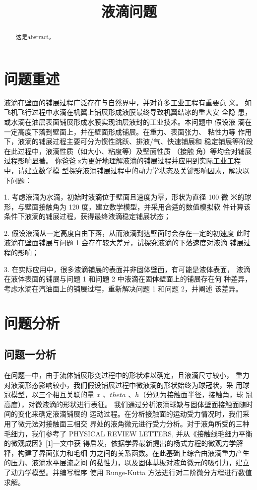 \documentclass{cumcmthesis}
\title{液滴问题}\tihao{A}
\begin{document}
\maketitle

\begin{abstract}
    这是abstract。

\end{abstract}

\section{问题重述}
液滴在壁面的铺展过程广泛存在与自然界中，并对许多工业工程有重要意
义。 如飞机飞行过程中水滴在机翼上铺展形成液膜最终导致机翼结冰的重大安
全隐 患，或水滴在油层表面铺展形成水膜实现油层液封的工业技术。本问题中
假设液 滴在一定高度下落到壁面上，并在壁面形成铺展。在重力、表面张力、
粘性力等 作用下，液滴的铺展过程主要可分为惯性跳跃、排液/气、快速铺展和
稳定铺展等阶段在此过程中，液滴性质（如大小、粘度等）及壁面性质 （接触
角）等均会对铺展过程影响显著。     你爸爸
z为更好地理解液滴的铺展过程并应用到实际工业工程中，请建立数学模
型探究液滴铺展过程中的动力学状态及关键影响因素，解决以下问题：

1. 考虑液滴为水滴，初始时液滴位于壁面且速度为零，形状为直径 100 微
米的球形，与壁面接触角为 120 度，建立数学模型，并采用合适的数值模拟软
件计算该条件下液滴的铺展过程，获得最终液滴稳定铺展状态；

2. 假设液滴从一定高度自由下落，从而液滴到达壁面时会存在一定的初速度
此时液滴在壁面铺展与问题 1 会存在较大差异，试探究液滴的下落速度对液滴
铺展过程的影响；

3. 在实际应用中，很多液滴铺展的表面并非固体壁面，有可能是液体表面，
液滴在液体表面的铺展与问题 1 和问题 2 中液滴在固体壁面上的铺展存在何
种差异，考虑水滴在汽油面上的铺展过程，重新解决问题 1 和问题 2，并阐述
该差异。
\section{问题分析}
\subsection{问题一分析}
在问题一中，由于流体铺展形变过程中的形状难以确定，且液滴尺寸较小，
重力对液滴形态影响较小，我们假设铺展过程中微液滴的形状始终为球冠状，采
用球冠模型，以三个相互关联的量 $x$ 、$theta$ 、$h$（分别为接触面半径，接触角，球
冠高度），对微液滴的形状进行表征。
我们通过分析液滴球缺与固体壁面接触面随时间的变化来确定液滴铺展的
运动过程。在分析接触面的运动受力情况时，我们采用了微元法对接触面三相交
界处的液角微元进行受力分析。对于液角所受的三种毛细力，我们参考了
PHYSICAL REVIEW LETTERS, 并从《接触线毛细力平衡的微观成因》[1]一文中获
得启发，依据学界最新提出的杨式方程的微观力学解释，构建了界面张力和毛细
力之间的关系函数。在此基础上综合由液滴重力产生的压力、液滴水平层流之间
的黏性力，以及固体基板对液角微元的吸引力，建立了动力学模型。并编写程序
使用 Runge-Kutta 方法进行对二阶微分方程进行数值求解。
\end{document}
